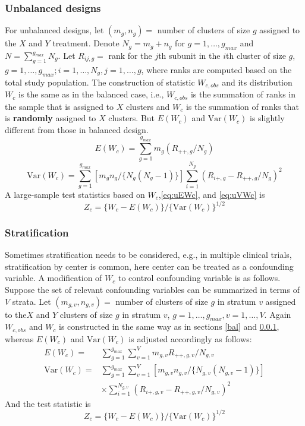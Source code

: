 \documentclass[12pt]{article}
\begin{document}
\subsubsection{Unbalanced designs}\label{unbal}
For unbalanced designs, let $(m_g, n_g)=$ number of clusters of size $g$ assigned to the $X$ and $Y$ treatment. Denote $N_g = m_g + n_g$ for $g=1,\ldots,g_{max}$ and $N =\sum_{g=1}^{g_{max}}N_g$. Let $R_{ij,g} = $ rank for the $j$th subunit in the $i$th cluster of size $g$, $g = 1, \ldots,g_{max}; i = 1, \ldots,N_g,j=1,\ldots,g$, where ranks are computed based on the total study population. 
The construction of statistic $W_{c,obs}$ and its distribution $W_c$ is the same as in the balanced case, i.e., $W_{c,obs}$ is the summation of ranks in the sample that is assigned to $X$ clusters and $W_c$ is the summation of ranks that is \textbf{randomly} assigned to $X$ clusters. But $E(W_c)$ and $\text{Var}(W_c)$ is slightly different from those in balanced design. 
\begin{equation}\label{eq:uEWc}
E(W_c) = \sum_{g=1}^{g_{max}}m_g(R_{++,g}/N_g)
\end{equation}
\begin{equation}\label{eq:uVWc}
\text{Var}(W_c) = \sum_{g=1}^{g_{max}}[m_gn_g/\{N_g(N_g - 1)\}]\sum_{i=1}^{N_g}(R_{i+,g} - R_{++,g}/N_g)^2
\end{equation}
A large-sample test statistics based on $W_c$,\eqref{eq:uEWc}, and \eqref{eq:uVWc} is 
\begin{equation}
Z_c = \{W_c - E(W_c)\}/\{\text{Var}(W_c)\}^{1/2}
\end{equation}
\subsubsection{Stratification}
Sometimes stratification needs to be considered, e.g., in multiple clinical trials, stratification by center is common, here center can be treated as a confounding variable. A modification of $W_c$ to control confounding variable is as follows. Suppose the set of relevant confounding variables can be summarized in terms of $V$ strata. Let $(m_{g,v}, n_{g,v})=$ number of clusters of size $g$ in stratum $v$ assigned to the$X$ and $Y$ clusters of size $g$ in stratum $v$, $g = 1, \ldots, g_{max}, v = 1, \ldots, V$. Again $W_{c,obs}$ and $W_c$ is constructed in the same way as in sections \ref{bal} and \ref{unbal}, whereas $E(W_c)$ and $\text{Var}(W_c)$ is adjusted accordingly as follows:
\begin{align*}
E(W_c)=& \sum_{g=1}^{g_{max}}\sum^V_{v=1}m_{g,v}R_{++,g,v}/N_{g,v}\\
\text{Var}(W_c)=& \sum_{g=1}^{g_{max}}\sum_{v=1}^V[m_{g,v}n_{g,v}/\{N_{g,v}(N_{g,v} - 1)\}]\\ 
&\times\sum_{i=1}^{N_{g,v}}(R_{i+, g, v} - R_{++, g, v}/N_{g,v})^2
\end{align*}
And the test statistic is
\begin{equation}
Z_c = \{W_c - E(W_c)\}/\{\text{Var}(W_c)\}^{1/2}
\end{equation}
\end{document}
